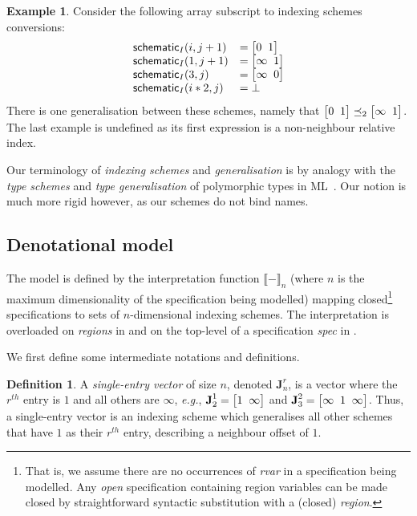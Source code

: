 \documentclass[10pt,preprint]{sigplanconf}
\newcounter{block}
\theoremstyle{definition}
\newtheorem{example}[block]{Example}
\newtheorem{definition}[block]{Definition}
\newcommand{\eg}{\emph{e.g.}}
\newcommand{\interp}[1]{\llbracket{#1}\rrbracket}
\newcommand{\vtwoh}[2]{\setlength{\arraycolsep}{0em}
\left[\begin{array}{cc}#1 \; & \; #2\end{array}\right]}
\newcommand{\vthreeh}[3]{\setlength{\arraycolsep}{0em}
\left[\begin{array}{ccc}#1 \; & \; #2 \; & \; #3\end{array}\right]}
\newcommand{\singleEntry}[2]{\textbf{J}_{#2}^{#1}}
\begin{document}
\begin{example}
Consider the following array subscript to indexing schemes
conversions:
%
\begin{align*}
\begin{array}{ll}
\schemeN{(i, j+1)} & =\vtwoh{0}{1} \\
\schemeN{(1, j+1)} & = \vtwoh{\infty}{1} \\
\schemeN{(3, j)} & = \vtwoh{\infty}{0} \\
\schemeN{(i*2, j)} & = \bot
\end{array}
\end{align*}
There is one generalisation between these
schemes, namely that $\vtwoh{0}{1} \preceq_2 \vtwoh{\infty}{1}$.
The last example is undefined as its first expression is a
non-neighbour relative index.
\end{example}

Our terminology of \emph{indexing schemes} and
\emph{generalisation} is by analogy
with the \emph{type schemes} and \emph{type generalisation} of
polymorphic types in ML~\cite{milner1978theory}. Our notion is
much more rigid however, as our schemes do not bind names.

\subsection{Denotational model}

The model is defined by the interpretation function $\interp{-}_n$
(where $n$ is the maximum dimensionality of the specification being
modelled) mapping closed\footnote{That is, we assume there are no
  occurrences of \textit{rvar} in a specification being modelled.  Any
  \emph{open} specification containing region variables can be made
  closed by straightforward syntactic substitution with a (closed)
  \textit{region}.} specifications to sets of
$n$-dimensional indexing schemes. The interpretation is overloaded on
\emph{regions} in  and on the top-level
of a specification \textit{spec} in .

We first define some intermediate notations and definitions.

\begin{definition}A \emph{single-entry vector} of size $n$, denoted
$\singleEntry{r}{n}$, is a vector where the $r^{th}$ entry is $1$
and all others are $\infty$, \eg{}, $\singleEntry{1}{2} =
\vtwoh{1}{\infty}$ and $\singleEntry{2}{3} = \vthreeh{\infty}{1}{\infty}$.
Thus, a single-entry vector is an indexing scheme which generalises
all other schemes that have $1$ as their $r^{th}$ entry,
describing a neighbour offset of $1$.
\end{definition}
\end{document}
